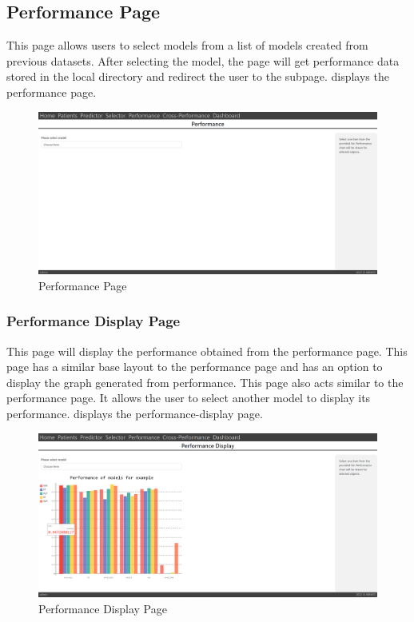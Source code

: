\subsection{Performance Page} \label{subsec:performance_page}
This page allows users to select models from a list of models created from previous datasets. After selecting the model, the page will get performance data stored in the local directory and redirect the user to the subpage.  displays the performance page.

\begin{figure}[H]
  \centering
  \includegraphics[width=0.7\columnwidth]{media/website/pages/performance.png}
  \caption{Performance Page}
  \label{fig:web_performance_page}
\end{figure}

\subsubsection{Performance Display Page} \label{subsubsec:performance_display_page}
This page will display the performance obtained from the performance page. This page has a similar base layout to the performance page and has an option to display the graph generated from performance. This page also acts similar to the performance page. It allows the user to select another model to display its performance.  displays the performance-display page.

\begin{figure}[H]
  \centering
  \includegraphics[width=0.7\columnwidth]{media/website/pages/performance_display.png}
  \caption{Performance Display Page}
  \label{fig:web_performance_display_page}
\end{figure}

